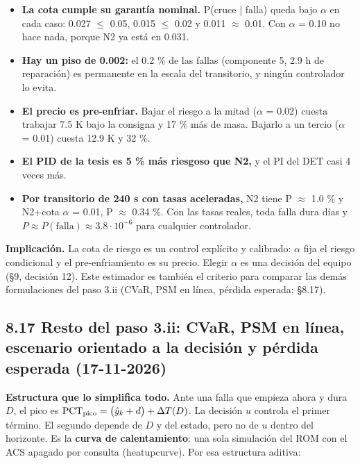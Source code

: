 \documentclass[11pt,a4paper]{article}
\newcommand{\codeus}{\textunderscore\allowbreak}
\newcommand{\code}[1]{{\small\ttfamily\let\_\codeus #1}}
\begin{document}
\begin{itemize}
\item \textbf{La cota cumple su garantía nominal.} P(cruce | falla) queda bajo $\alpha$ en cada caso: 0.027 $\le$ 0.05, 0.015 $\le$ 0.02 y 0.011 $\approx$ 0.01. Con $\alpha$ = 0.10 no hace nada, porque N2 ya está en 0.031.
\item \textbf{Hay un piso de 0.002:} el 0.2 \% de las fallas (componente 5, 2.9 h de reparación) es permanente en la escala del transitorio, y ningún controlador lo evita.
\item \textbf{El precio es pre-enfriar.} Bajar el riesgo a la mitad ($\alpha$ = 0.02) cuesta trabajar 7.5 K bajo la consigna y 17 \% más de masa. Bajarlo a un tercio ($\alpha$ = 0.01) cuesta 12.9 K y 32 \%.
\item \textbf{El PID de la tesis es 5 \% más riesgoso que N2,} y el PI del DET casi 4 veces más.
\item \textbf{Por transitorio de 240 s con tasas aceleradas,} N2 tiene P $\approx$ 1.0 \% y N2+cota $\alpha$ = 0.01, P $\approx$ 0.34 \%. Con las tasas reales, toda falla dura días y $P\approx P(\text{falla})\approx3.8\cdot10^{-6}$ para cualquier controlador.
\end{itemize}

\textbf{Implicación.} La cota de riesgo es un control explícito y calibrado: $\alpha$ fija el riesgo condicional y el pre-enfriamiento es su precio. Elegir $\alpha$ es una decisión del equipo (\S{}9, decisión 12). Este estimador es también el criterio para comparar las demás formulaciones del paso 3.ii (CVaR, PSM en línea, pérdida esperada; \S{}8.17).

\subsection*{8.17 Resto del paso 3.ii: CVaR, PSM en línea, escenario orientado a la decisión y pérdida esperada (17-11-2026)}
\textbf{Estructura que lo simplifica todo.} Ante una falla que empieza ahora y dura $D$, el pico es $\mathrm{PCT}_{\rm pico}=\big(\hat y_k+d\big)+\Delta T(D)$. La decisión $u$ controla el primer término. El segundo depende de $D$ y del estado, pero no de $u$ dentro del horizonte. Es la \textbf{curva de calentamiento}: una sola simulación del ROM con el ACS apagado por consulta (\code{heatup\_curve}). Por esa estructura aditiva:
\end{document}
